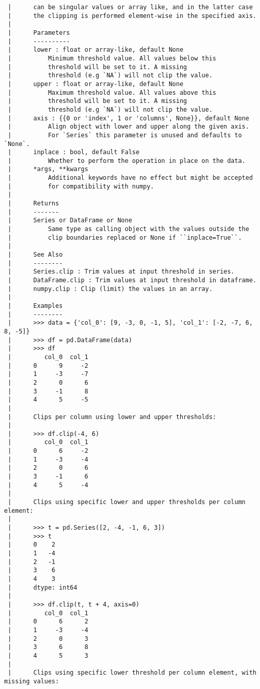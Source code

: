 \documentclass[
  letterpaper,
  DIV=11,
  numbers=noendperiod]{scrreprt}
\begin{document}
\begin{verbatim}
 |      can be singular values or array like, and in the latter case
 |      the clipping is performed element-wise in the specified axis.
 |      
 |      Parameters
 |      ----------
 |      lower : float or array-like, default None
 |          Minimum threshold value. All values below this
 |          threshold will be set to it. A missing
 |          threshold (e.g `NA`) will not clip the value.
 |      upper : float or array-like, default None
 |          Maximum threshold value. All values above this
 |          threshold will be set to it. A missing
 |          threshold (e.g `NA`) will not clip the value.
 |      axis : {{0 or 'index', 1 or 'columns', None}}, default None
 |          Align object with lower and upper along the given axis.
 |          For `Series` this parameter is unused and defaults to `None`.
 |      inplace : bool, default False
 |          Whether to perform the operation in place on the data.
 |      *args, **kwargs
 |          Additional keywords have no effect but might be accepted
 |          for compatibility with numpy.
 |      
 |      Returns
 |      -------
 |      Series or DataFrame or None
 |          Same type as calling object with the values outside the
 |          clip boundaries replaced or None if ``inplace=True``.
 |      
 |      See Also
 |      --------
 |      Series.clip : Trim values at input threshold in series.
 |      DataFrame.clip : Trim values at input threshold in dataframe.
 |      numpy.clip : Clip (limit) the values in an array.
 |      
 |      Examples
 |      --------
 |      >>> data = {'col_0': [9, -3, 0, -1, 5], 'col_1': [-2, -7, 6, 8, -5]}
 |      >>> df = pd.DataFrame(data)
 |      >>> df
 |         col_0  col_1
 |      0      9     -2
 |      1     -3     -7
 |      2      0      6
 |      3     -1      8
 |      4      5     -5
 |      
 |      Clips per column using lower and upper thresholds:
 |      
 |      >>> df.clip(-4, 6)
 |         col_0  col_1
 |      0      6     -2
 |      1     -3     -4
 |      2      0      6
 |      3     -1      6
 |      4      5     -4
 |      
 |      Clips using specific lower and upper thresholds per column element:
 |      
 |      >>> t = pd.Series([2, -4, -1, 6, 3])
 |      >>> t
 |      0    2
 |      1   -4
 |      2   -1
 |      3    6
 |      4    3
 |      dtype: int64
 |      
 |      >>> df.clip(t, t + 4, axis=0)
 |         col_0  col_1
 |      0      6      2
 |      1     -3     -4
 |      2      0      3
 |      3      6      8
 |      4      5      3
 |      
 |      Clips using specific lower threshold per column element, with missing values:

\end{verbatim}
\end{document}
